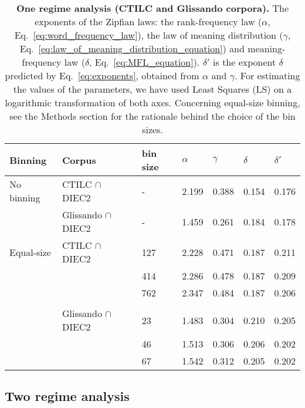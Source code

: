 \documentclass[10pt,letterpaper]{article}
\begin{document}
\begin{table}[!ht]
\centering
\small
\begin{tabular}{l l l l l l l}
\hline
Binning & \textbf{Corpus} & bin size & $\alpha$ & $\gamma$ & $\delta$ & $\delta'$ \\
\hline
No binning  & CTILC $\cap$ DIEC2 & -  & 2.199 & 0.388 & \cellcolor{Gray}0.154 & \cellcolor{Gray}0.176 \\
            & Glissando $\cap$ DIEC2 & - & 1.459 & 0.261 & \cellcolor{Gray}0.184 & \cellcolor{Gray}0.178 \\
\hline
Equal-size  & CTILC $\cap$ DIEC2 & 127  & 2.228 & 0.471 & \cellcolor{Gray}0.187 & \cellcolor{Gray}0.211 \\
            &                    & 414  & 2.286 & 0.478 & \cellcolor{Gray}0.187 & \cellcolor{Gray}0.209 \\
            &                    & 762  & 2.347 & 0.484 & \cellcolor{Gray}0.187 & \cellcolor{Gray}0.206 \\ \\
            & Glissando $\cap$ DIEC2 & 23 & 1.483 & 0.304 & \cellcolor{Gray}0.210 & \cellcolor{Gray}0.205 \\
            &                    & 46  & 1.513 & 0.306 & \cellcolor{Gray}0.206 & \cellcolor{Gray}0.202 \\
            &                    & 67  & 1.542 & 0.312 & \cellcolor{Gray}0.205 & \cellcolor{Gray}0.202 \\
\hline
\end{tabular}
\caption{\textbf{One regime analysis (CTILC and Glissando corpora).} The exponents of the Zipfian laws: the rank-frequency law ($\alpha$, Eq.~\ref{eq:word_frequency_law}), the law of meaning distribution ($\gamma$, Eq.~\ref{eq:law_of_meaning_distribution_equation}) and meaning-frequency law ($\delta$, Eq.~\ref{eq:MFL_equation}). $\delta'$ is the exponent $\delta$ predicted by Eq.~\ref{eq:exponents}, obtained from $\alpha$ and $\gamma$. For estimating the values of the parameters, we have used Least Squares (LS) on a logarithmic transformation of both axes. Concerning equal-size binning, see the Methods section for the rationale behind the choice of the bin sizes.
}
\label{exponents_table}
\end{table}

\subsection*{Two regime analysis}
\end{document}
